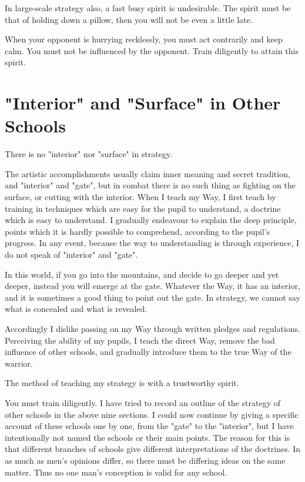 \documentclass[12pt]{report}
\begin{document}
In large-scale strategy also, a fast busy spirit is undesirable. The spirit must be that of holding down a pillow, then you will not be even a little late.

When your opponent is hurrying recklessly, you must act contrarily and keep calm. You must not be influenced by the opponent. Train diligently to attain this spirit.
\section*{"Interior" and "Surface" in Other Schools}
There is no "interior" nor "surface" in strategy.

The artistic accomplishments usually claim inner meaning and secret tradition, and "interior" and "gate", but in combat there is no such thing as fighting on the surface, or cutting with the interior. When I teach my Way, I first teach by training in techniques which are easy for the pupil to understand, a doctrine which is easy to understand. I gradually endeavour to explain the deep principle, points which it is hardly possible to comprehend, according to the pupil's progress. In any event, because the way to understanding is through experience, I do not speak of "interior" and "gate".

In this world, if you go into the mountains, and decide to go deeper and yet deeper, instead you will emerge at the gate. Whatever the Way, it has an interior, and it is sometimes a good thing to point out the gate. In strategy, we cannot say what is concealed and what is revealed.

Accordingly I dislike passing on my Way through written pledges and regulations. Perceiving the ability of my pupils, I teach the direct Way, remove the bad influence of other schools, and gradually introduce them to the true Way of the warrior.

The method of teaching my strategy is with a trustworthy spirit.

You must train diligently. I have tried to record an outline of the strategy of other schools in the above nine sections. I could now continue by giving a specific account of these schools one by one, from the "gate" to the "interior", but I have intentionally not named the schools or their main points. The reason for this is that different branches of schools give different interpretations of the doctrines. In as much as men's opinions differ, so there must be differing ideas on the same matter. Thus no one man's conception is valid for any school.
\end{document}
